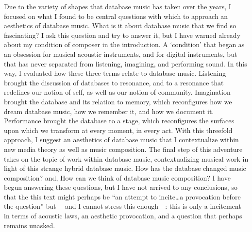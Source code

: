 Due to the variety of shapes that database music has taken over the years, I focused on what I found to be central questions with which to approach an aesthetics of database music. What is it about database music that we find so fascinating? I ask this question and try to answer it, but I have warned already about my condition of composer in the introduction. A `condition' that began as an obsession for musical acoustic instruments, and for digital instruments, but that has never separated from listening, imagining, and performing sound. In this way, I evaluated how these three terms relate to database music. Listening brought the discussion of databases to resonance, and to a resonance that redefines our notion of self, as well as our notion of community. Imagination brought the database and its relation to memory, which reconfigures how we dream database music, how we remember it, and how we document it. Performance brought the database to a stage, which reconfigures the surfaces upon which we transform at every moment, in every act. With this threefold approach, I suggest an aesthetics of database music that I contextualize within new media theory as well as music composition. The final step of this adventure takes on the topic of work within database music, contextualizing musical work in light of this strange hybrid database music. How has the database changed music composition? and, How can we think of database music composition? I have begun answering these questions, but I have not arrived to any conclusions, so that the this text might perhaps be ``an attempt to incite\dots a provocation before the question'' but ---and I cannot stress this enough---: this is only a incitement in terms of acoustic laws, an aesthetic provocation, and a question that perhaps remains unasked.
